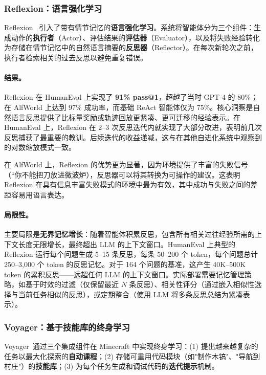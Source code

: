 \subsubsection{Reflexion：语言强化学习}

Reflexion~\citep{reflexion2023} 引入了带有情节记忆的\textbf{语言强化学习}。系统将智能体分为三个组件：生成动作的\textbf{执行者}（Actor）、评估结果的\textbf{评估器}（Evaluator），以及将失败经验转化为存储在情节记忆中的自然语言摘要的\textbf{反思器}（Reflector）。在每次新轮次之前，执行者检索相关的过去反思以避免重复错误。

\paragraph{结果。}
Reflexion 在 HumanEval 上实现了 \textbf{91\% pass@1}，超越了当时 GPT-4 的 80\%；在 AlfWorld 上达到 97\% 成功率，而基础 ReAct 智能体仅为 75\%。核心洞察是自然语言反思提供了比标量奖励或轨迹回放更紧凑、更可迁移的经验表示。在 HumanEval 上，Reflexion 在 2--3 次反思迭代内就实现了大部分改进，表明前几次反思捕获了最重要的教训。后续迭代的收益递减，这与在其他自进化系统中观察到的对数缩放模式一致。

在 AlfWorld 上，Reflexion 的优势更为显著，因为环境提供了丰富的失败信号（``你不能把刀放进微波炉），反思器可以将其转换为可操作的建议。这表明 Reflexion 在具有信息丰富失败模式的环境中最为有效，其中成功与失败之间的差距容易用语言表达。

\paragraph{局限性。}
主要局限是\textbf{无界记忆增长}：随着智能体积累反思，包含所有相关过往经验所需的上下文长度无限增长，最终超出 LLM 的上下文窗口。HumanEval 上典型的 Reflexion 运行每个问题生成 5--15 条反思，每条 50--200 个 token，每个问题总计 250--3,000 个 token 的反思记忆。对于 164 个问题的基准，这产生 40K--500K token 的累积反思——远超任何 LLM 的上下文窗口。实际部署需要记忆管理策略，如基于时效的过滤（仅保留最近 $N$ 条反思）、相关性评分（通过嵌入相似性选择与当前任务相似的反思），或定期整合（使用 LLM 将多条反思总结为紧凑表示）。


\subsubsection{Voyager：基于技能库的终身学习}

Voyager~\citep{voyager2023}通过三个集成组件在 Minecraft 中实现终身学习：(1) 提出越来越复杂的任务以最大化探索的\textbf{自动课程}；(2) 存储可重用代码模块（如"制作木镐"、"导航到村庄"）的\textbf{技能库}；(3) 为每个任务生成和调试代码的\textbf{迭代提示}机制。

